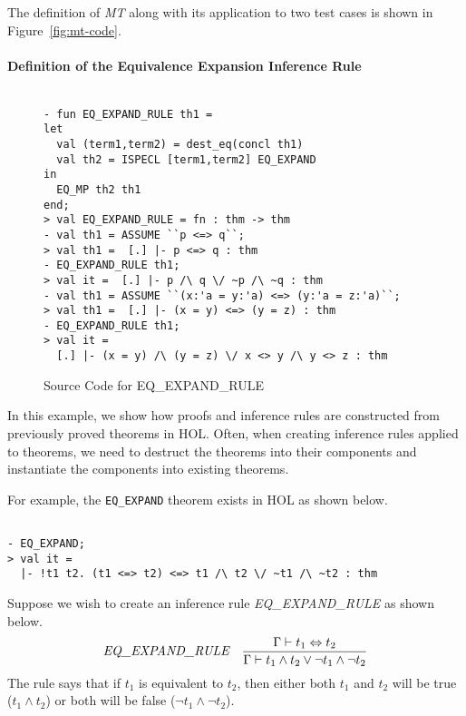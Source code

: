 The definition of \emph{MT} along with its application to two test
cases is shown in Figure~\ref{fig:mt-code}.

\paragraph*{Definition of the Equivalence Expansion Inference Rule}
\label{sec:equiv-expansion-rule}

\begin{figure}[t]
  \centering
  \begin{small}
    \begin{session}
\begin{verbatim}

- fun EQ_EXPAND_RULE th1 =
let
  val (term1,term2) = dest_eq(concl th1)
  val th2 = ISPECL [term1,term2] EQ_EXPAND
in
  EQ_MP th2 th1
end;
> val EQ_EXPAND_RULE = fn : thm -> thm
- val th1 = ASSUME ``p <=> q``;
> val th1 =  [.] |- p <=> q : thm
- EQ_EXPAND_RULE th1;
> val it =  [.] |- p /\ q \/ ~p /\ ~q : thm
- val th1 = ASSUME ``(x:'a = y:'a) <=> (y:'a = z:'a)``;
> val th1 =  [.] |- (x = y) <=> (y = z) : thm
- EQ_EXPAND_RULE th1;
> val it =  
  [.] |- (x = y) /\ (y = z) \/ x <> y /\ y <> z : thm
\end{verbatim}
    \end{session}
  \end{small}
  \caption{Source Code for EQ\_EXPAND\_RULE}
  \label{fig:eq-expand-rule-code}
\end{figure}

In this example, we show how proofs and inference rules are
constructed from previously proved theorems in HOL.  Often, when
creating inference rules applied to theorems, we need to destruct the
theorems into their components and instantiate the components into
existing theorems.

For example, the \texttt{EQ\_EXPAND} theorem exists in HOL as shown
below.
\begin{session}
\begin{verbatim}

- EQ_EXPAND;
> val it = 
  |- !t1 t2. (t1 <=> t2) <=> t1 /\ t2 \/ ~t1 /\ ~t2 : thm
\end{verbatim}
\end{session}

Suppose we wish to create an inference rule \emph{EQ\_EXPAND\_RULE} as
shown below.
\begin{gather*}
  \irule
  {\seqs{\Gamma}{t_1 \Leftrightarrow t_2}}
  {\seqs{\Gamma}{t_1 \wedge t_2 \vee \neg t_1 \wedge \neg t_2}}
  {EQ\_EXPAND\_RULE}
\end{gather*}
The rule says that if $t_1$ is equivalent to $t_2$, then either both
$t_1$ and $t_2$ will be true ($t_1 \wedge t_2$) or both will be false
($\neg t_1 \wedge \neg t_2$).

